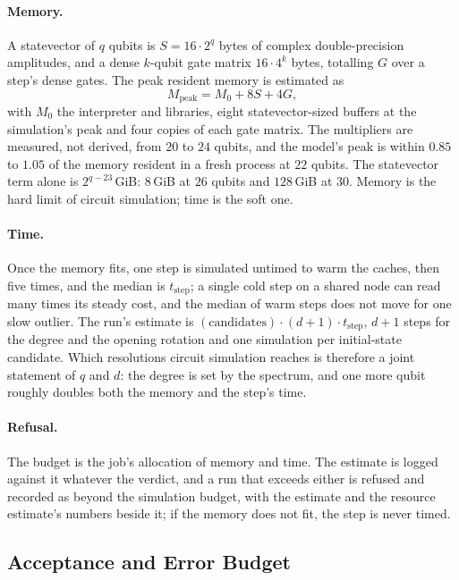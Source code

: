 \paragraph{Memory.} A statevector of $q$ qubits is $S=16\cdot2^q$ bytes of complex double-precision amplitudes, and a dense $k$-qubit gate matrix $16\cdot4^k$ bytes, totalling $G$ over a step's dense gates. The peak resident memory is estimated as
\begin{equation*}
    M_{\mathrm{peak}}=M_0+8S+4G,
\end{equation*}
with $M_0$ the interpreter and libraries, eight statevector-sized buffers at the simulation's peak and four copies of each gate matrix. The multipliers are measured, not derived, from $20$ to $24$ qubits, and the model's peak is within $0.85$ to $1.05$ of the memory resident in a fresh process at $22$ qubits. The statevector term alone is $2^{q-23}$\,GiB: $8$\,GiB at $26$ qubits and $128$\,GiB at $30$. Memory is the hard limit of circuit simulation; time is the soft one.

\paragraph{Time.} Once the memory fits, one step is simulated untimed to warm the caches, then five times, and the median is $t_{\mathrm{step}}$; a single cold step on a shared node can read many times its steady cost, and the median of warm steps does not move for one slow outlier. The run's estimate is $(\text{candidates})\cdot(d+1)\cdot t_{\mathrm{step}}$, $d+1$ steps for the degree and the opening rotation and one simulation per initial-state candidate. Which resolutions circuit simulation reaches is therefore a joint statement of $q$ and $d$: the degree is set by the spectrum, and one more qubit roughly doubles both the memory and the step's time.

\paragraph{Refusal.} The budget is the job's allocation of memory and time. The estimate is logged against it whatever the verdict, and a run that exceeds either is refused and recorded as beyond the simulation budget, with the estimate and the resource estimate's numbers beside it; if the memory does not fit, the step is never timed.

\subsection{Acceptance and Error Budget}
\label{app:error-budget}

